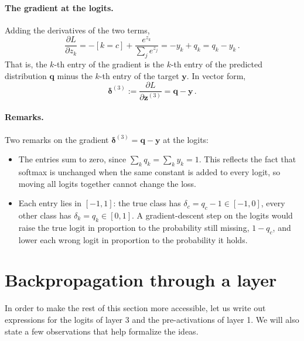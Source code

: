 \documentclass[12pt]{article}
\numberwithin{equation}{section} %
\newcommand{\vc}[1]{\symbf{#1}}
\begin{document}
\paragraph{The gradient at the logits.}
Adding the derivatives of the two terms,
\begin{equation}\label{eq:dLdz}
    \dfrac{\partial L}{\partial z_k}
      = -[k{=}c]+\dfrac{e^{z_k}}{\sum_j e^{z_j}}
      = - y_k + q_k = q_k - y_k \, .
\end{equation}
That is, the $k$-th entry of the gradient is the $k$-th
entry of the predicted distribution $\vc{q}$ minus the
$k$-th entry of the target $\vc{y}$. In vector form,
\begin{equation}\label{eq:delta3}
  \vc{\delta}^{(3)}:=\dfrac{\partial L}{\partial\vc{z}^{(3)}}=\vc{q}-\vc{y}\,.
\end{equation}

\paragraph{Remarks.}
Two remarks on the gradient $\vc{\delta}^{(3)}=\vc{q}-\vc{y}$
at the logits:
\begin{itemize}
  \item The entries sum to zero, since
        $\sum_k q_k=\sum_k y_k=1$. This reflects the fact that
        softmax is unchanged when the same constant is
        added to every logit, so moving all logits
        together cannot change the loss.
  \item Each entry lies in $[-1,1]$: the true
        class has $\delta_c=q_c-1\in[-1,0]$, every other
        class has $\delta_k=q_k\in[0,1]$. A gradient-descent
        step on the logits would raise the true logit in
        proportion to the probability still missing,
        $1-q_c$, and lower each wrong logit in
        proportion to the probability it holds.

\end{itemize}

\section{Backpropagation through a layer}
In order to make the rest of this section more
accessible, let us write out expressions for
the logits of layer 3 and the pre-activations of
layer 1. We will also state a few
observations that help formalize the ideas.
\end{document}
